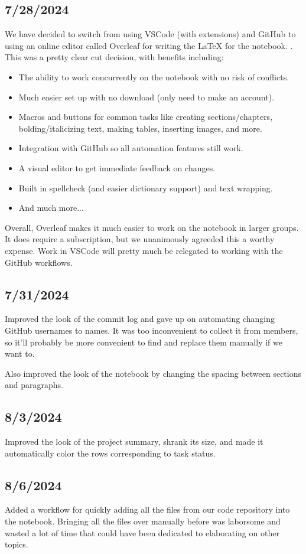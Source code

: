 \subsection{7/28/2024}
We have decided to switch from using VSCode (with extensions) and GitHub to using an online editor called Overleaf for writing the \LaTeX{} for the notebook. 
\cite{bib:overleaf}. This was a pretty clear cut decision, with benefits
including:
\begin{itemize}
      \item The ability to work concurrently on the notebook with no risk of
            conflicts.
      \item Much easier set up with no download (only need to make an account).
      \item Macros and buttons for common tasks like creating sections/chapters,
            bolding/italicizing text, making tables, inserting images, and more.
      \item Integration with GitHub so all automation features still work.
      \item A visual editor to get immediate feedback on changes.
      \item Built in spellcheck (and easier dictionary support) and text wrapping.
      \item And much more...
\end{itemize}
Overall, Overleaf makes it much easier to work on the notebook in larger groups. It does require a subscription, but we
unanimously agreeded this a worthy expense. Work in VSCode will pretty much
be relegated to working with the GitHub workflows.
\subsection{7/31/2024}
Improved the look of the commit log and gave up on automating changing GitHub
usernames to names. It was too inconvenient to collect it from members, so it'll
probably be more convenient to find and replace them manually if we want to.
\par Also improved the look of the notebook by changing the spacing between
sections and paragraphs.
\subsection{8/3/2024}
Improved the look of the project summary, shrank its size, and made it automatically
color the rows corresponding to task status.
\subsection{8/6/2024}
Added a workflow for quickly adding all the files from our code repository into the
notebook. Bringing all the files over manually before was laborsome and wasted a lot
of time that could have been dedicated to elaborating on other topics.
